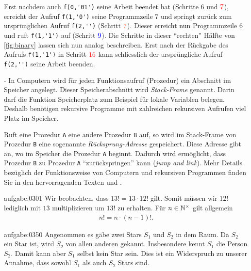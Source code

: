 \noindent
Erst nachdem auch \verb|f(0,'01')| seine Arbeit beendet hat (Schritte $6$ und $\textcolor{Red}{7}$), erreicht der Aufruf \verb|f(1,'0')| seine Programmzeile $7$ und springt zurück zum ursprünglichen Aufruf \verb|f(2,'')| (Schritt $\textcolor{Red}{7}$). Dieser erreicht nun Programmzeile $6$ und ruft \verb|f(1,'1')| auf (Schritt $\textcolor{Blue}{9}$). Die Schritte in dieser \enquote{rechten} Hälfte von \cref{fig:binary} lassen sich nun analog beschreiben. Erst nach der Rückgabe des Aufrufs \verb|f(1,'1')| in Schritt $\textcolor{Red}{16}$ kann schliesslich der ursprüngliche Aufruf \verb|f(2,'')| seine Arbeit beenden.

\clearpage
\begin{myBox}{-}
In Computern wird für jeden Funktionsaufruf (Prozedur) ein Abschnitt im Speicher angelegt. Dieser Speicherabschnitt wird \textit{Stack-Frame} genannt. Darin darf die Funktion Speicherplatz zum Beispiel für lokale Variablen belegen. Deshalb benötigen rekursive Programme mit zahlreichen rekursiven Aufrufen viel Platz im Speicher.

Ruft eine Prozedur \verb|A| eine andere Prozedur \verb|B| auf, so wird im Stack-Frame von Prozedur \verb|B| eine sogenannte \textit{Rücksprung-Adresse} gespeichert. Diese Adresse gibt an, wo im Speicher die Prozedur \verb|A| beginnt. Dadurch wird ermöglicht, dass Prozedur \verb|B| zu Prozedur \verb|A| \enquote{zurückspringen} kann (\textit{jump and link}). Mehr Details bezüglich der Funktionsweise von Computern und rekursiven Programmen finden Sie in den hervorragenden Texten \cite{Malvino} und \cite{Sauter}.
\end{myBox}





\begin{antwort}{aufgabe:0301}
Wir beobachten, dass $13! = 13\cdot 12!$ gilt. Somit müssen wir $12!$ lediglich mit $13$ multiplizieren um $13!$ zu erhalten. Für $n\in\mathbb{N}^{\times}$ gilt allgemein
\begin{align*}
    n! = n\cdot (n-1)!.
\end{align*}
\end{antwort}


\begin{antwort}{aufgabe:0350}
Angenommen es gäbe zwei Stars $S_1$ und $S_2$ in dem Raum. Da $S_2$ ein Star ist, wird $S_2$ von allen anderen gekannt. Insbesondere kennt $S_1$ die Person $S_2$. Damit kann aber $S_1$ selbst kein Star sein. Dies ist ein Widerspruch zu unserer Annahme, dass sowohl $S_1$ als auch $S_2$ Stars sind.
\end{antwort}


